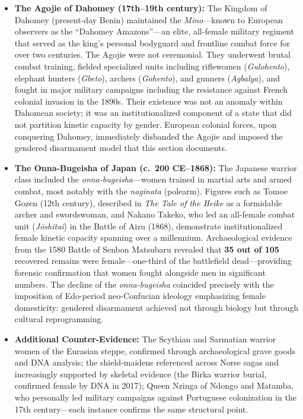 \documentclass[12pt,openany]{book}
\begin{document}
\begin{itemize}
    \item \textbf{The Agojie of Dahomey (17th--19th century):} The Kingdom of Dahomey (present-day Benin) maintained the \textit{Mino}---known to European observers as the ``Dahomey Amazons''---an elite, all-female military regiment that served as the king's personal bodyguard and frontline combat force for over two centuries. The Agojie were not ceremonial. They underwent brutal combat training, fielded specialized units including riflewomen (\textit{Gulohento}), elephant hunters (\textit{Gbeto}), archers (\textit{Gohento}), and gunners (\textit{Agbalya}), and fought in major military campaigns including the resistance against French colonial invasion in the 1890s. Their existence was not an anomaly within Dahomean society; it was an institutionalized component of a state that did not partition kinetic capacity by gender. European colonial forces, upon conquering Dahomey, immediately disbanded the Agojie and imposed the gendered disarmament model that this section documents.

    \item \textbf{The Onna-Bugeisha of Japan (c.\ 200 CE--1868):} The Japanese warrior class included the \textit{onna-bugeisha}---women trained in martial arts and armed combat, most notably with the \textit{naginata} (polearm). Figures such as Tomoe Gozen (12th century), described in \textit{The Tale of the Heike} as a formidable archer and swordswoman, and Nakano Takeko, who led an all-female combat unit (\textit{J\={o}shitai}) in the Battle of Aizu (1868), demonstrate institutionalized female kinetic capacity spanning over a millennium. Archaeological evidence from the 1580 Battle of Senbon Matsubaru revealed that \textbf{35 out of 105} recovered remains were female---one-third of the battlefield dead---providing forensic confirmation that women fought alongside men in significant numbers. The decline of the \textit{onna-bugeisha} coincided precisely with the imposition of Edo-period neo-Confucian ideology emphasizing female domesticity: gendered disarmament achieved not through biology but through cultural reprogramming.

    \item \textbf{Additional Counter-Evidence:} The Scythian and Sarmatian warrior women of the Eurasian steppe, confirmed through archaeological grave goods and DNA analysis; the shield-maidens referenced across Norse sagas and increasingly supported by skeletal evidence (the Birka warrior burial, confirmed female by DNA in 2017); Queen Nzinga of Ndongo and Matamba, who personally led military campaigns against Portuguese colonization in the 17th century---each instance confirms the same structural point.
\end{itemize}
\end{document}

